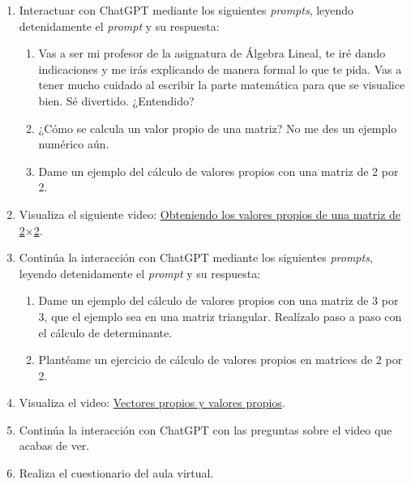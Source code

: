 \documentclass[a4,11pt]{aleph-notas}
\begin{document}
\begin{enumerate}[leftmargin=*]
    \item Interactuar con ChatGPT mediante los siguientes \textit{prompts}, leyendo detenidamente el \textit{prompt} y su respuesta:
    \begin{enumerate}[label=\textit{Prompt \arabic*.},leftmargin=2.1cm]
        \item Vas a ser mi profesor de la asignatura de Álgebra Lineal, te iré dando indicaciones y me irás explicando de manera formal lo que te pida. Vas a tener mucho cuidado al escribir la parte matemática para que se visualice bien. Sé divertido. ¿Entendido?
        \item ¿Cómo se calcula un valor propio de una matriz? No me des un ejemplo numérico aún.
        \item Dame un ejemplo del cálculo de valores propios con una matriz de 2 por 2.
    \end{enumerate}
    \item Visualiza el siguiente video: \href{https://youtu.be/HET8XcIX-n4?si=t4lUbTmWaPOTbtAM}{Obteniendo los valores propios de una matriz de 2$\times$2}.
    \item Continúa la interacción con ChatGPT mediante los siguientes \textit{prompts}, leyendo detenidamente el \textit{prompt} y su respuesta:
    \begin{enumerate}[label=\textit{Prompt \arabic*.},leftmargin=2.1cm,start=4]
        \item Dame un ejemplo del cálculo de valores propios con una matriz de 3 por 3, que el ejemplo sea en una matriz triangular. Realízalo paso a paso con el cálculo de determinante.
        \item Plantéame un ejercicio de cálculo de valores propios en matrices de 2 por 2.
    \end{enumerate}
    \item Visualiza el video: \href{https://youtu.be/Gx0PaWI9eYo?si=oTPRSIfeEopspelW}{Vectores propios y valores propios}.
    \item Continúa la interacción con ChatGPT con las preguntas sobre el video que acabas de ver.
    \item Realiza el cuestionario del aula virtual.
\end{enumerate}
\end{document}
